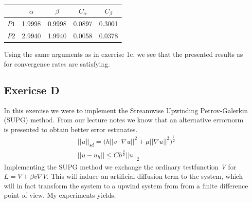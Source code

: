 \documentclass[a4paper,norsk]{article}
\begin{document}
\begin{center}
\begin{tabular}{ ||c c c c c|| }
    \hline
& $\alpha$ & $\beta$ & $C_{\alpha}$ & $C_{\beta}$ \\
\hline\hline
$P1$ & 1.9998  &  0.9998 & 0.0897 & 0.3001 \\
\hline
$P2$ & 2.9940 & 1.9940 & 0.0058 & 0.0378 \\
\hline
\end{tabular}
\end{center}

Using the same arguments as in exercise 1c, we see that the presented results
as for convergence rates are satisfying.
\newpage
\subsection*{Exericse D}
In this exercise we were to implement the  Streamwise Upwinding
Petrov-Galerkin (SUPG) method. From our lecture notes we know that an
alternative errornorm is presented to obtain better error estimates.
\begin{align*}
||u||_{sd} = \Big(h ||v \cdot \nabla u||^2 +
\mu ||\nabla u ||^2  \Big)^{\frac{1}{2}} \\
||u - u_h || \leq Ch^{\frac{3}{2}} ||u||_2
\end{align*}
Implementing the SUPG method we exchange the ordinary testfunction \textit{V}
for $L = V + \beta v  \nabla V$. This will induce an artificial diffusion term
to the system, which will in fact transform the system to a upwind system from
from a finite difference point of view. My experiments yields.
\end{document}
